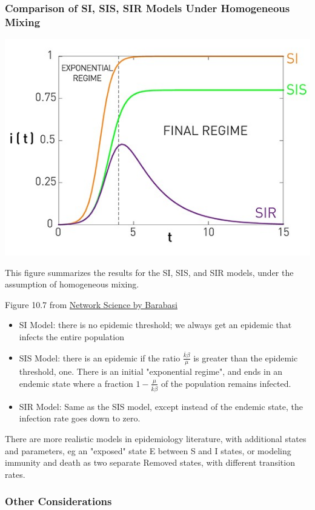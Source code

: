 \documentclass[11pt]{scrartcl} %
\begin{document}
\subsubsection{Comparison of SI, SIS, SIR Models Under Homogeneous Mixing}
\begin{center}
\includegraphics[width=0.75\linewidth]{img/L9.4_ModelComparisonHomogeneous.jpg}

This figure summarizes the results for the SI, SIS, and SIR models, under the assumption of homogeneous mixing.



{\tiny Figure 10.7 from \href{http://networksciencebook.com/}{Network Science by Barabasi}}
\end{center}

\begin{itemize}
	\item SI Model: there is no epidemic threshold; we always get an epidemic that infects the entire population
	\item SIS Model: there is an epidemic if the ratio $\frac{\bar{k}\beta}{\mu}$ is greater than the epidemic threshold, one. There is an initial "exponential regime", and ends in an endemic state where a fraction $1-\frac{\mu}{\bar{k}\beta}$ of the population remains infected.
	\item SIR Model: Same as the SIS model, except instead of the endemic state, the infection rate goes down to zero.
\end{itemize}

There are more realistic models in epidemiology literature, with additional states and parameters, eg an "exposed" state E between S and I states, or modeling immunity and death as two separate Removed states, with different transition rates. 

\subsubsection{Other Considerations}
\end{document}
